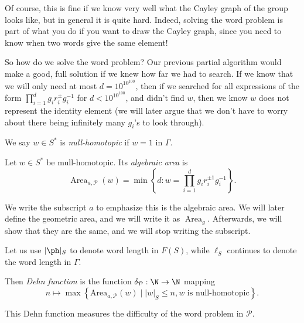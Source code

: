 \documentclass[a4paper]{article}
\DeclareMathOperator\Area{Area}
\begin{document}
\begin{eg}
\begin{center}
  \end{center}
\end{eg}

Of course, this is fine if we know very well what the Cayley graph of the group looks like, but in general it is quite hard. Indeed, solving the word problem is part of what you do if you want to draw the Cayley graph, since you need to know when two words give the same element!

So how do we solve the word problem? Our previous partial algorithm would make a good, full solution if we knew how far we had to search. If we know that we will only need at most $d = 10^{10^{100}}$, then if we searched for all expressions of the form $\prod_{i = 1}^d g_i r_i^{\pm} g_i^{-1}$ for $d < 10^{10^{100}}$, and didn't find $w$, then we know $w$ does not represent the identity element (we will later argue that we don't have to worry about there being infinitely many $g_i$'s to look through).

\begin{defi}
  We say $w \in S^*$ is \emph{null-homotopic} if $w = 1$ in $\Gamma$.
\end{defi}

\begin{defi}
  Let $w \in S^*$ be mull-homotopic. Its \emph{algebraic area} is
  \[
    \Area_{a, \mathcal{P}} (w) = \min \left\{d : w = \prod_{i = 1}^d g_i r_i^{\pm 1} g_i^{-1}\right\}.
  \]
\end{defi}
We write the subscript $a$ to emphasize this is the algebraic area. We will later define the geometric area, and we will write it as $\Area_g$. Afterwards, we will show that they are the same, and we will stop writing the subscript.

Let us use $|\ph|_S$ to denote word length in $F(S)$, while $\ell_S$ continues to denote the word length in $\Gamma$.

\begin{defi}
  Then \emph{Dehn function} is the function $\delta_{\mathcal{P}}: \N \to \N$ mapping
  \[
    n \mapsto \max \left\{ \mathrm{Area}_{a, \mathcal{P}} (w) \mid |w|_S \leq n, w \text{ is null-homotopic}\right\}.
  \]
\end{defi}
This Dehn function measures the difficulty of the word problem in $\mathcal{P}$.
\end{document}
